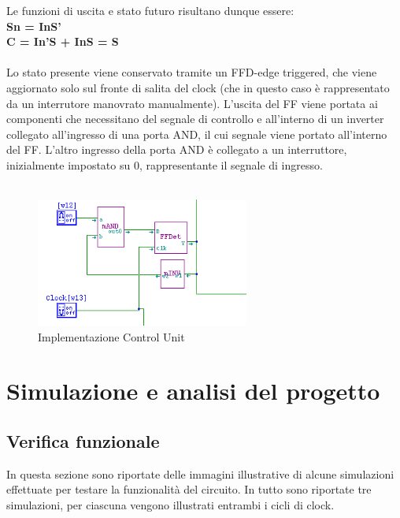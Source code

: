 \documentclass[10pt]{article}
\begin{document}
\begin{itemize}
Le funzioni di uscita e stato futuro risultano dunque essere:
\\
\textbf{Sn = InS'}\\ 
\textbf{C = In'S + InS = S}
\\
\\
Lo stato presente viene conservato tramite un FFD-edge triggered,
che viene aggiornato solo sul fronte di salita del clock (che in questo caso è rappresentato da un interrutore manovrato manualmente). 
L'uscita del FF viene portata ai componenti che necessitano del segnale di controllo e all'interno di un inverter collegato all'ingresso di una porta AND, il cui segnale viene portato
all'interno del FF. L'altro ingresso della porta AND è collegato a un interruttore, inizialmente impostato su 0, rappresentante il segnale di ingresso. 
\\
\\
\begin{figure}[ht]
    \begin{minipage}[c]{\textwidth}
    \centering
    \includegraphics[width=70mm]{cu}
    \caption{Implementazione Control Unit}
    \label{ }
    \end{minipage}
\end{figure}

\newpage

\section{Simulazione e analisi del progetto}
\subsection{Verifica funzionale}
In questa sezione sono riportate delle immagini illustrative di alcune simulazioni effettuate per testare la funzionalità del circuito. In tutto sono riportate tre simulazioni, per ciascuna vengono 
illustrati entrambi i cicli di clock.


\end{itemize}
\end{document}
